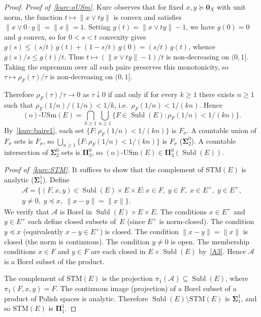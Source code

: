 \documentclass[12pt]{amsart}
\renewcommand{\le}{\leqslant}
\renewcommand{\ge}{\geqslant}
\theoremstyle{plain}
\theoremstyle{definition}
\theoremstyle{remark}
\DeclareMathOperator{\Subl}{Subl}
\begin{document}
\begin{proof}
\medskip
\emph{Proof of~\ref{kurc:oUSm}.}
Kurc observes that for fixed $x, y \succeq \mathbf{0}_X$ with unit norm, the
function $t \mapsto \lVert x \vee t y \rVert$ is convex and satisfies
$\lVert x \vee 0 \cdot y \rVert = \lVert x \rVert = 1$.  Setting
$g(t) = \lVert x \vee t y \rVert - 1$, we have $g(0) = 0$ and $g$ convex,
so for $0 < s < t$ convexity gives
$g(s) \le (s/t)\, g(t) + (1 - s/t)\, g(0) = (s/t)\, g(t)$, whence
$g(s)/s \le g(t)/t$.  Thus $t \mapsto (\lVert x \vee t y \rVert - 1) / t$ is
non-decreasing on $(0, 1]$.  Taking the supremum over all such pairs preserves
this monotonicity, so $\tau \mapsto \rho_F(\tau) / \tau$ is non-decreasing
on $(0, 1]$.

Therefore $\rho_F(\tau) / \tau \to 0$ as $\tau \downarrow 0$ if and only if
for every $k \ge 1$ there exists $n \ge 1$ such that
$\rho_F(1/n) / (1/n) < 1/k$, i.e.\ $\rho_F(1/n) < 1/(kn)$.  Hence
\[
    \mathrm{(o)\text{-}USm}(E)
    = \bigcap_{k \ge 1} \bigcup_{n \ge 1}
      \bigl\{F \in \Subl(E) \colon \rho_F(1/n) < 1/(kn)\bigr\}.
\]
By~\ref{kurc:baire1}, each set $\{F \colon \rho_F(1/n) < 1/(kn)\}$ is
$F_\sigma$.  A countable union of $F_\sigma$ sets is $F_\sigma$, so
$\bigcup_{n \ge 1} \{F \colon \rho_F(1/n) < 1/(kn)\}$ is $F_\sigma$
($\boldsymbol{\Sigma}^0_2$).  A countable intersection of
$\boldsymbol{\Sigma}^0_2$ sets is $\boldsymbol{\Pi}^0_3$, so
$\mathrm{(o)\text{-}USm}(E) \in \boldsymbol{\Pi}^0_3(\Subl(E))$.

\medskip
\emph{Proof of~\ref{kurc:STM}.}
It suffices to show that the complement of $\mathrm{STM}(E)$ is analytic
($\boldsymbol{\Sigma}^1_1$).  Define
\begin{multline*}
    \mathcal{A} = \bigl\{(F, x, y) \in \Subl(E) \times E \times E \colon
    x \in F,\; y \in F,\; x \in E^+,\; y \in E^+,\\
    y \ne 0,\; y \preceq x,\;
    \lVert x - y \rVert = \lVert x \rVert\bigr\}.
\end{multline*}
We verify that $\mathcal{A}$ is Borel in
$\Subl(E) \times E \times E$.  The conditions $x \in E^+$ and $y \in E^+$ each
define closed subsets of~$E$ (since $E^+$ is norm-closed).  The condition
$y \preceq x$ (equivalently $x - y \in E^+$) is closed.  The condition
$\lVert x - y \rVert = \lVert x \rVert$ is closed (the norm is continuous).
The condition $y \ne 0$ is open.  The membership conditions $x \in F$ and
$y \in F$ are each closed in $E \times \Subl(E)$ by~\ref{A3}.  Hence
$\mathcal{A}$ is a Borel subset of the product.

The complement of $\mathrm{STM}(E)$ is the projection
$\pi_1(\mathcal{A}) \subseteq \Subl(E)$, where
$\pi_1(F, x, y) = F$.  The continuous image (projection) of a Borel subset of a
product of Polish spaces is analytic.  Therefore
$\Subl(E) \setminus \mathrm{STM}(E)$ is $\boldsymbol{\Sigma}^1_1$, and so
$\mathrm{STM}(E)$ is $\boldsymbol{\Pi}^1_1$.
\end{proof}
\end{document}
